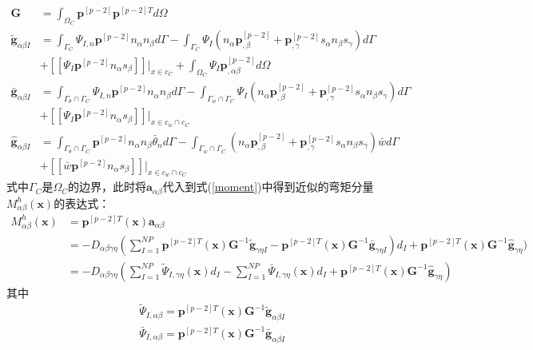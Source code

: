 \begin{subequations}
\begin{align}
\label{PG}\pmb{G}&=\int_{\Omega_C}\pmb{p}^{[p-2]}\pmb{p}^{[p-2]T}d\Omega\\
\label{Pg1}\tilde{\pmb g}_{\alpha\beta I}&=\int_{\Gamma_C}\Psi_{I,n}\pmb{p}^{[p-2]}n_{\alpha}n_{\beta}d\Gamma-\int_{\Gamma_C}\Psi_I(n_{\alpha}\pmb{p}^{[p-2]}_{,\beta}+\pmb{p}^{[p-2]}_{,\gamma}s_{\alpha}n_{\beta}s_{\gamma})d\Gamma \nonumber\\
&+[[\Psi_I\pmb{p}^{[p-2]}n_{\alpha}s_{\beta}]]\vert_{x\in c_C}+\int_{\Omega_C}\Psi_I\pmb{p}^{[p-2]}_{,\alpha\beta}d\Omega\\
\label{Pg2}\bar{\pmb g}_{\alpha\beta I}&=\int_{{\Gamma_{\theta}}\cap{\Gamma_C}}\Psi_{I,n}\pmb{p}^{[p-2]}n_{\alpha}n_{\beta}d\Gamma-\int_{{\Gamma_w}\cap{\Gamma_C}}\Psi_I(n_{\alpha}\pmb{p}^{[p-2]}_{,\beta}+\pmb{p}^{[p-2]}_{,\gamma}s_{\alpha}n_{\beta}s_{\gamma})d\Gamma\nonumber\\
&+[[\Psi_I\pmb{p}^{[p-2]}n_{\alpha}s_{\beta}]]\vert_{x\in{c_w}\cap{c_C}}\\
\label{Pg3}\hat{\pmb g}_{\alpha\beta I}&=\int_{{\Gamma_{\theta}}\cap{\Gamma_C}}\pmb{p}^{[p-2]}n_{\alpha}n_{\beta}\bar{\theta}_nd\Gamma-\int_{{\Gamma_w}\cap{\Gamma_C}}(n_{\alpha}\pmb{p}^{[p-2]}_{,\beta}+\pmb{p}^{[p-2]}_{,\gamma}s_{\alpha}n_{\beta}s_{\gamma})\bar{w}d\Gamma\nonumber\\
&+[[\bar{w}\pmb{p}^{[p-2]}n_{\alpha}s_{\beta}]]\vert_{x\in{c_w}\cap{c_C}}
\end{align}
\end{subequations}
式中$\Gamma_C$是$\Omega_C$的边界，此时将$\pmb{a}_{\alpha\beta}$代入到式(\ref{moment})中得到近似的弯矩分量$M^h_{\alpha\beta}(\pmb{x})$的表达式：
\begin{equation}
\begin{split}
M^h_{\alpha\beta}(\pmb{x})&=\pmb{p}^{[p-2]T}(\pmb{x})\pmb a_{\alpha\beta}\\
&=-D_{\alpha\beta\gamma\eta}(\sum_{I=1}^{N\!P}\pmb{p}^{[p-2]T}(\pmb x)\pmb G^{-1}\tilde{\pmb g}_{\gamma\eta I}-\pmb{p}^{[p-2]T}(\pmb x)\pmb G^{-1}\bar{\pmb g}_{\gamma\eta I})d_I+\pmb{p}^{[p-2]T}(\pmb x)\pmb G^{-1}\hat{\pmb g}_{\gamma\eta})\\
&=-D_{\alpha\beta\gamma\eta}(\sum_{I=1}^{N\!P}\tilde{\Psi}_{I,\gamma\eta}(\pmb x)d_I-\sum_{I=1}^{N\!P}\bar{\Psi}_{I,\gamma\eta}(\pmb{x})d_I+\pmb{p}^{[p-2]T}(\pmb x)\pmb G^{-1}\hat{\pmb g}_{\gamma\eta})
\end{split}
\end{equation}
其中
\begin{align}
 \label{PTPSI}&\tilde{\Psi}_{I,\alpha\beta}=\pmb{p}^{[p-2]T}(\pmb x)\pmb G^{-1}\tilde{\pmb g}_{\alpha\beta I}\\
 \label{PBPSI}&\bar{\Psi}_{I,\alpha\beta}=\pmb{p}^{[p-2]T}(\pmb x)\pmb G^{-1}\bar{\pmb g}_{\alpha\beta I}
\end{align}\par
